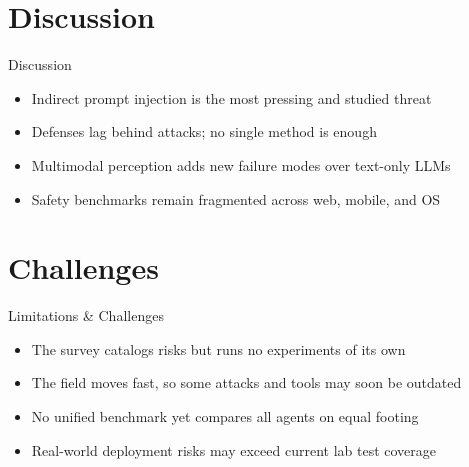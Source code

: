 \documentclass[10pt]{beamer}
\begin{document}
\section{Discussion}
\begin{frame}{Discussion}
\begin{itemize}
  \item Indirect prompt injection is the most pressing and studied threat
  \item Defenses lag behind attacks; no single method is enough
  \item Multimodal perception adds new failure modes over text-only LLMs
  \item Safety benchmarks remain fragmented across web, mobile, and OS
\end{itemize}
\end{frame}
\section{Challenges}
\begin{frame}{Limitations \& Challenges}
\begin{itemize}
  \item The survey catalogs risks but runs no experiments of its own
  \item The field moves fast, so some attacks and tools may soon be outdated
  \item No unified benchmark yet compares all agents on equal footing
  \item Real-world deployment risks may exceed current lab test coverage
\end{itemize}
\end{frame}
\end{document}
